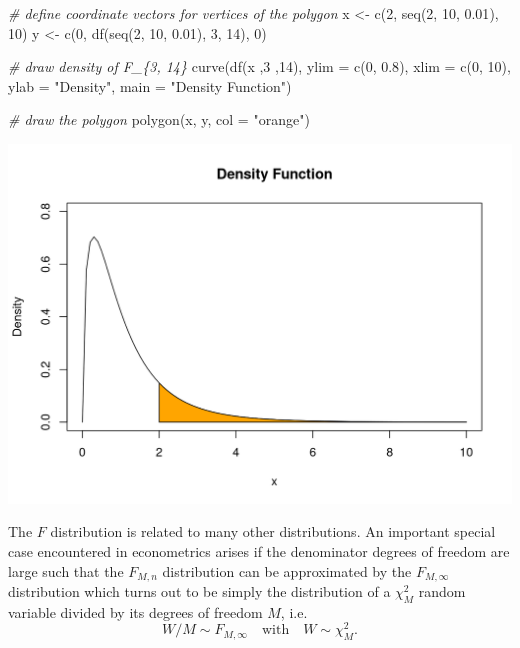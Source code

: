 \documentclass[
  14pt,
]{memoir}
\newenvironment{Shaded}{\begin{snugshade}}{\end{snugshade}}
\newcommand{\AttributeTok}[1]{\textcolor[rgb]{0.77,0.63,0.00}{#1}}
\newcommand{\CommentTok}[1]{\textcolor[rgb]{0.56,0.35,0.01}{\textit{#1}}}
\newcommand{\DecValTok}[1]{\textcolor[rgb]{0.00,0.00,0.81}{#1}}
\newcommand{\FloatTok}[1]{\textcolor[rgb]{0.00,0.00,0.81}{#1}}
\newcommand{\FunctionTok}[1]{\textcolor[rgb]{0.00,0.00,0.00}{#1}}
\newcommand{\NormalTok}[1]{#1}
\newcommand{\OtherTok}[1]{\textcolor[rgb]{0.56,0.35,0.01}{#1}}
\newcommand{\StringTok}[1]{\textcolor[rgb]{0.31,0.60,0.02}{#1}}
\begin{document}
\begin{Shaded}
\begin{Highlighting}[]
\CommentTok{\# define coordinate vectors for vertices of the polygon}
\NormalTok{x }\OtherTok{\textless{}{-}} \FunctionTok{c}\NormalTok{(}\DecValTok{2}\NormalTok{, }\FunctionTok{seq}\NormalTok{(}\DecValTok{2}\NormalTok{, }\DecValTok{10}\NormalTok{, }\FloatTok{0.01}\NormalTok{), }\DecValTok{10}\NormalTok{)}
\NormalTok{y }\OtherTok{\textless{}{-}} \FunctionTok{c}\NormalTok{(}\DecValTok{0}\NormalTok{, }\FunctionTok{df}\NormalTok{(}\FunctionTok{seq}\NormalTok{(}\DecValTok{2}\NormalTok{, }\DecValTok{10}\NormalTok{, }\FloatTok{0.01}\NormalTok{), }\DecValTok{3}\NormalTok{, }\DecValTok{14}\NormalTok{), }\DecValTok{0}\NormalTok{)}

\CommentTok{\# draw density of F\_\{3, 14\}}
\FunctionTok{curve}\NormalTok{(}\FunctionTok{df}\NormalTok{(x ,}\DecValTok{3}\NormalTok{ ,}\DecValTok{14}\NormalTok{), }
      \AttributeTok{ylim =} \FunctionTok{c}\NormalTok{(}\DecValTok{0}\NormalTok{, }\FloatTok{0.8}\NormalTok{), }
      \AttributeTok{xlim =} \FunctionTok{c}\NormalTok{(}\DecValTok{0}\NormalTok{, }\DecValTok{10}\NormalTok{), }
      \AttributeTok{ylab =} \StringTok{"Density"}\NormalTok{,}
      \AttributeTok{main =} \StringTok{"Density Function"}\NormalTok{)}

\CommentTok{\# draw the polygon}
\FunctionTok{polygon}\NormalTok{(x, y, }\AttributeTok{col =} \StringTok{"orange"}\NormalTok{)}
\end{Highlighting}
\end{Shaded}

\begin{center}\includegraphics[width=0.8\linewidth]{figure/minimal-unnamed-chunk-51-1} \end{center}

The \(F\) distribution is related to many other distributions. An important special case encountered in econometrics arises if the denominator degrees of freedom are large such that the \(F_{M,n}\) distribution can be approximated by the \(F_{M,\infty}\) distribution which turns out to be simply the distribution of a \(\chi^2_M\) random variable divided by its degrees of freedom \(M\), i.e.~
\[ 
W/M \sim F_{M,\infty} \quad\text{with}\quad W \sim \chi^2_M.
\]
\end{document}
